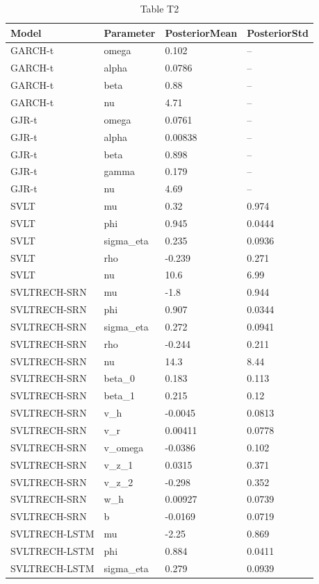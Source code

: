 \begin{table}[htbp]
\centering
\caption{Table T2}
\label{tab:T2}
\begin{tabular}{llll}
\toprule
Model & Parameter & PosteriorMean & PosteriorStd \\
\midrule
GARCH-t & omega & 0.102 & -- \\
GARCH-t & alpha & 0.0786 & -- \\
GARCH-t & beta & 0.88 & -- \\
GARCH-t & nu & 4.71 & -- \\
GJR-t & omega & 0.0761 & -- \\
GJR-t & alpha & 0.00838 & -- \\
GJR-t & beta & 0.898 & -- \\
GJR-t & gamma & 0.179 & -- \\
GJR-t & nu & 4.69 & -- \\
SVLT & mu & 0.32 & 0.974 \\
SVLT & phi & 0.945 & 0.0444 \\
SVLT & sigma\_eta & 0.235 & 0.0936 \\
SVLT & rho & -0.239 & 0.271 \\
SVLT & nu & 10.6 & 6.99 \\
SVLTRECH-SRN & mu & -1.8 & 0.944 \\
SVLTRECH-SRN & phi & 0.907 & 0.0344 \\
SVLTRECH-SRN & sigma\_eta & 0.272 & 0.0941 \\
SVLTRECH-SRN & rho & -0.244 & 0.211 \\
SVLTRECH-SRN & nu & 14.3 & 8.44 \\
SVLTRECH-SRN & beta\_0 & 0.183 & 0.113 \\
SVLTRECH-SRN & beta\_1 & 0.215 & 0.12 \\
SVLTRECH-SRN & v\_h & -0.0045 & 0.0813 \\
SVLTRECH-SRN & v\_r & 0.00411 & 0.0778 \\
SVLTRECH-SRN & v\_omega & -0.0386 & 0.102 \\
SVLTRECH-SRN & v\_z\_1 & 0.0315 & 0.371 \\
SVLTRECH-SRN & v\_z\_2 & -0.298 & 0.352 \\
SVLTRECH-SRN & w\_h & 0.00927 & 0.0739 \\
SVLTRECH-SRN & b & -0.0169 & 0.0719 \\
SVLTRECH-LSTM & mu & -2.25 & 0.869 \\
SVLTRECH-LSTM & phi & 0.884 & 0.0411 \\
SVLTRECH-LSTM & sigma\_eta & 0.279 & 0.0939 \\

\end{tabular}
\end{table}
